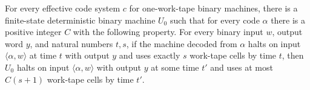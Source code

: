 \begin{theorem}
\label{Turing.exists_selfUniversal}
\leanok
{}
For every effective code system $c$ for one-work-tape binary machines, there is a
finite-state deterministic binary machine $U_0$ such that for every code $\alpha$ there
is a positive integer $C$ with the following property. For every binary input $w$,
output word $y$, and natural numbers $t,s$, if the machine decoded from $\alpha$ halts
on input $\langle\alpha,w\rangle$ at time $t$ with output $y$ and uses exactly $s$
work-tape cells by time $t$, then $U_0$ halts on input $\langle\alpha,w\rangle$ with
output $y$ at some time $t'$ and uses at most $C(s+1)$ work-tape cells by time $t'$.
\end{theorem}
